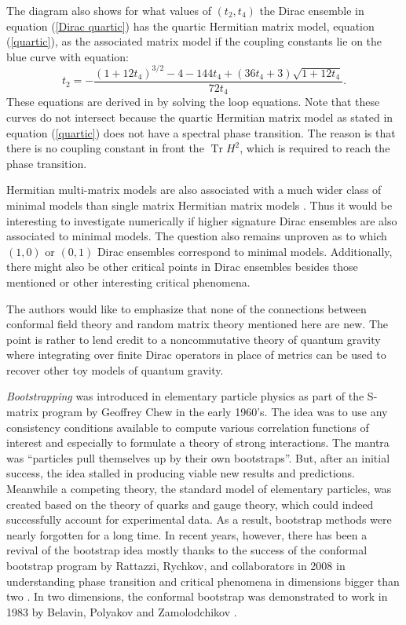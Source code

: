 \documentclass[10pt]{article}
\makeatletter
\DeclareMathOperator{\tr}{Tr}
\def\section{\@startsection{section}{1}{\z@}{-3.25ex plus -1ex minus
		-.2ex}{1.5ex plus .2ex}{\normalfont\bfseries}}
\makeatother
\begin{document}
The diagram also shows for what values of $(t_{2},t_{4})$ the Dirac ensemble in equation (\ref{Dirac quartic}) has the quartic Hermitian matrix model, equation (\ref{quartic}), as the associated matrix model if the coupling constants lie on the blue curve with equation:
\begin{equation*}
t_2=-\frac{(1 + 12 t_4)^{3/2} - 4 - 144 t_4 + (36 t_4 + 3) \sqrt{1 + 12 t_4}}{72 t_4}.
\end{equation*}
These equations are derived in \cite{HKP 2} by solving the loop equations. Note that  these curves do not intersect because the quartic Hermitian matrix model as stated in equation (\ref{quartic}) does not have a spectral phase transition. The reason is that there is no coupling constant in front the $\tr H^{2}$, which is required to reach the phase transition. 


Hermitian multi-matrix models  are also associated  with  a much wider class of minimal models than single matrix Hermitian matrix models \cite{DS multi 1, Ds multi 2}. Thus it would be interesting to investigate numerically if higher signature Dirac ensembles  are also associated to minimal models. The question also remains unproven as to which $(1,0)$ or $(0,1)$ Dirac ensembles correspond to minimal models. Additionally, there might also be other critical points in Dirac ensembles besides those mentioned or other interesting critical phenomena.

The authors would like to emphasize that none of the connections between conformal field theory and random matrix theory  mentioned here are new. The point is rather to lend credit to a noncommutative theory of quantum gravity where integrating over finite Dirac operators in place of metrics can be used to recover other toy models of quantum gravity.


\section{Bootstrapping the loop equations}\label{boot}


{\it Bootstrapping} was introduced in elementary particle physics as part of the S-matrix program by Geoffrey Chew in the early 1960's. The idea was to use any consistency conditions available to compute various correlation functions of interest  and especially to formulate a theory of strong interactions. The mantra was  ``particles pull themselves up by their own bootstraps''. But, after an initial success,  the idea stalled in producing  viable new results and predictions.   Meanwhile a  competing theory, the standard model of elementary particles, was created based on the theory of   quarks   and  gauge theory,  which  could  indeed successfully account for experimental data. As a result,  bootstrap methods   were nearly  forgotten for a long time. 
In recent years,  however,  there has been a revival of the bootstrap idea  mostly  thanks to  the  success of the conformal bootstrap program  by Rattazzi,  Rychkov, and collaborators in 2008  in understanding phase transition and critical phenomena in dimensions bigger than two \cite{RRTV}. In two dimensions, the conformal bootstrap was demonstrated to work in 1983 by  Belavin,  Polyakov and  Zamolodchikov \cite{BPZ}.
\end{document}
